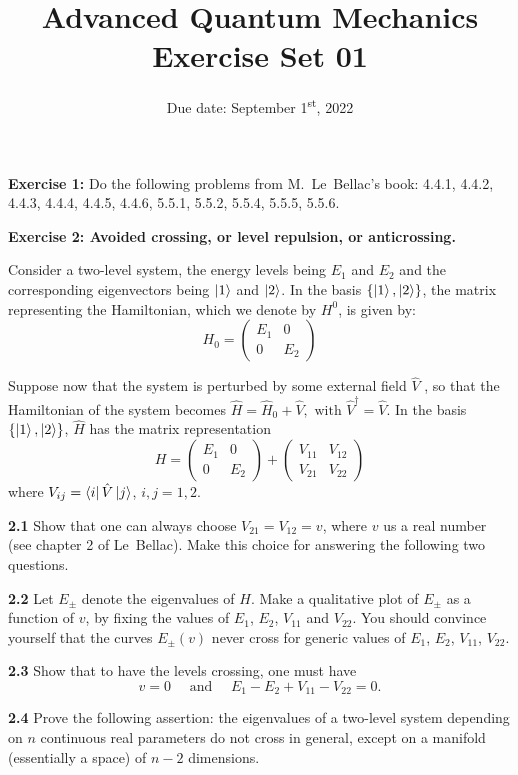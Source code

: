 \documentclass[12pt]{article}
\title{Advanced Quantum Mechanics\\Exercise Set 01}
\date{Due date: September 1\textsuperscript{st}, 2022}
\begin{document}
\maketitle

\textbf{Exercise 1:} Do the following problems from M.~Le~Bellac's book:
4.4.1,
4.4.2,
4.4.3,
4.4.4,
4.4.5,
4.4.6,
5.5.1, 
5.5.2, 
5.5.4, 
5.5.5, 
5.5.6.

\textbf{Exercise 2: Avoided crossing, or level repulsion, or anticrossing.}

Consider a two-level system, the energy levels being $E_1$ and $E_2$ and the corresponding eigenvectors being $\ket{1}$ and $\ket{2}$. 
In the basis $\{\ket{1},\ket{2}\}$, the matrix representing the Hamiltonian, which we denote by $H^0$, is given by:
\[
H_{0}=\left(\begin{array}{cc}E_{1} & 0 \\ 0 & E_{2}\end{array}\right)
\]

Suppose now that the system is perturbed by some external field $\hat{V}$ , so that the Hamiltonian of the system becomes $\hat{H}=\hat{H}_{0}+\hat{V}, \text { with } \hat{V}^{\dagger}=\hat{V}$.
In the basis $\{\ket{1},\ket{2}\}$, $\hat{H}$ has the matrix representation
\[
H=\left(\begin{array}{cc}E_{1} & 0 \\ 0 & E_{2}\end{array}\right)+\left(\begin{array}{ll}V_{11} & V_{12} \\ V_{21} & V_{22}\end{array}\right)
\]
where $V_{ij} = \bra{i}\hat{V}\ket{j}$, $i,j=1,2$.

\textbf{2.1} Show that one can always choose $V_{21} = V_{12} = v$, where $v$ us a real number
(see chapter 2 of Le~Bellac). Make this choice for answering the following two questions.

\textbf{2.2} Let $E_\pm$ denote the eigenvalues of $H$. 
Make a qualitative plot of $E_\pm$ as a function of $v$, by fixing the values of $E_1$, $E_2$, $V_{11}$ and $V_{22}$. 
You should convince yourself that the curves $E_\pm(v)$ never cross for generic values of $E_1$, $E_2$, $V_{11}$, $V_{22}$.

\textbf{2.3} Show that to have the levels crossing, one must have
\[
v=0 \quad \text { and } \quad E_{1}-E_{2}+V_{11}-V_{22}=0.
\]

\textbf{2.4} Prove the following assertion: the eigenvalues of a two-level system depending on $n$ continuous real parameters do not cross in general, except on a manifold (essentially a space) of $n − 2$ dimensions.
\end{document}
